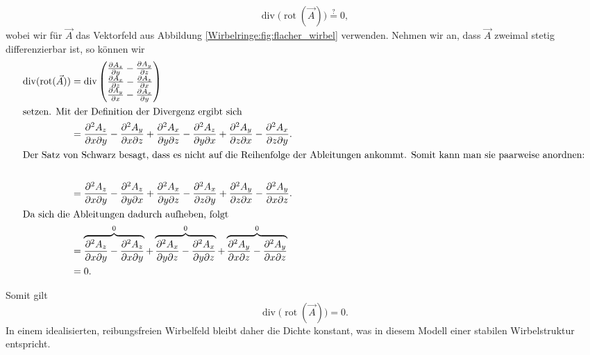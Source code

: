 \begin{equation*}
\operatorname{div} \big( \operatorname{rot} ( \vec{A} ) \big)
\stackrel{?}{=}
0,
\end{equation*}
wobei wir für \(\vec{A}\) das Vektorfeld aus Abbildung \ref{Wirbelringe:fig:flacher_wirbel} verwenden.
Nehmen wir an, dass \(\vec{A}\) zweimal stetig differenzierbar ist, so können wir
\begin{align*}
\operatorname{div} ( \operatorname{rot} ( \vec{A} ) )
&=
\operatorname{div}      
    \begin{pmatrix} 
        \frac{\partial A_z}{\partial y} - \frac{\partial A_y}{\partial z} \\ 
        \frac{\partial A_x}{\partial z} - \frac{\partial A_z}{\partial x} \\ 
        \frac{\partial A_y}{\partial x} - \frac{\partial A_x}{\partial y} \\ 
    \end{pmatrix} \\
\intertext{setzen. Mit der Definition der Divergenz ergibt sich}
&=
\frac{\partial^2 A_z}{\partial x \partial y} - \frac{\partial^2 A_y}{\partial x \partial z} + 
\frac{\partial^2 A_x}{\partial y \partial z} - \frac{\partial^2 A_z}{\partial y \partial x} +
\frac{\partial^2 A_y}{\partial z \partial x} - \frac{\partial^2 A_x}{\partial z \partial y}
.\\
\intertext{Der Satz von Schwarz besagt, dass es nicht auf die Reihenfolge der Ableitungen ankommt. Somit kann man sie paarweise anordnen:}\\
&=
\frac{\partial^2 A_z}{\partial x \partial y} - \frac{\partial^2 A_z}{\partial y \partial x} + 
\frac{\partial^2 A_x}{\partial y \partial z} - \frac{\partial^2 A_x}{\partial z \partial y} +
\frac{\partial^2 A_y}{\partial z \partial x} - \frac{\partial^2 A_y}{\partial x \partial z}.
\\
\intertext{Da sich die Ableitungen dadurch aufheben, folgt}
&=
\overbrace{\frac{\partial^2 A_z}{\partial x \partial y} - \frac{\partial^2 A_z}{\partial x \partial y}}^0 + 
\overbrace{\frac{\partial^2 A_x}{\partial y \partial z} - \frac{\partial^2 A_x}{\partial y \partial z}}^0 +
\overbrace{\frac{\partial^2 A_y}{\partial x \partial z} - \frac{\partial^2 A_y}{\partial x \partial z}}^0
\\
&=
0.
\end{align*}

 Somit gilt 
 \begin{equation} 
    \label{Wirbelringe:eq:wIdent} 
    \operatorname{div} \big( \operatorname{rot} ( \vec{A} ) \big) 
    = 
    0. 
\end{equation} 
In einem idealisierten, reibungsfreien Wirbelfeld bleibt daher die Dichte konstant, was in diesem Modell einer stabilen Wirbelstruktur entspricht.

